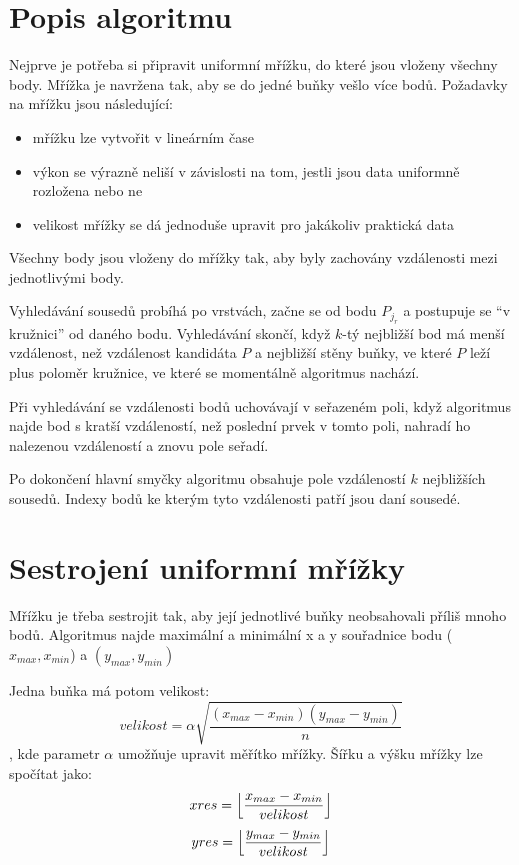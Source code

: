 \documentclass[
12pt,
a4paper,
pdftex,
czech,
titlepage
]{report}
\providecommand{\tightlist}{%
  \setlength{\itemsep}{0pt}\setlength{\parskip}{0pt}}
\begin{document}
\hypertarget{popis-algoritmu}{%
\chapter{Popis algoritmu}\label{popis-algoritmu}}

Nejprve je potřeba si připravit uniformní mřížku, do které jsou vloženy
všechny body. Mřížka je navržena tak, aby se do jedné buňky vešlo více
bodů. Požadavky na mřížku jsou následující:

\begin{itemize}
\tightlist
\item
  mřížku lze vytvořit v lineárním čase
\item
  výkon se výrazně neliší v závislosti na tom, jestli jsou data
  uniformně rozložena nebo ne
\item
  velikost mřížky se dá jednoduše upravit pro jakákoliv praktická data
\end{itemize}

Všechny body jsou vloženy do mřížky tak, aby byly zachovány vzdálenosti
mezi jednotlivými body.

Vyhledávání sousedů probíhá po vrstvách, začne se od bodu \(P_{j_{r}}\)
a postupuje se ``v kružnici'' od daného bodu. Vyhledávání skončí, když
\(k\)-tý nejbližší bod má menší vzdálenost, než vzdálenost kandidáta
\(P\) a nejbližší stěny buňky, ve které \(P\) leží plus poloměr
kružnice, ve které se momentálně algoritmus nachází.

Při vyhledávání se vzdálenosti bodů uchovávají v seřazeném poli, když algoritmus najde bod s kratší vzdáleností, než
poslední prvek v tomto poli, nahradí ho nalezenou vzdáleností a znovu pole seřadí.

Po dokončení hlavní smyčky algoritmu obsahuje pole vzdáleností \(k\)
nejbližších sousedů. Indexy bodů ke kterým tyto vzdálenosti patří jsou
daní sousedé.

\hypertarget{sestrojeni_mrizky}{%
\chapter{Sestrojení uniformní mřížky}\label{sestrojeni_mrizky}}

Mřížku je třeba sestrojit tak, aby její jednotlivé buňky neobsahovali
příliš mnoho bodů. Algoritmus najde maximální a minimální x a y souřadnice
bodu (\(x_{max}, x_{min}\)) a \((y_{max}, y_{min})\)

Jedna buňka má potom velikost:
\[velikost = \alpha \sqrt{\frac{(x_{max} - x_{min})(y_{max} - y_{min})}{n}}\], kde
parametr \(\alpha\) umožňuje upravit měřítko mřížky. Šířku a výšku
mřížky lze spočítat jako:
\[xres = \Bigl\lfloor{\frac{x_{max}-x_{min}}{velikost}}\Bigr\rfloor\]
\[yres = \Bigl\lfloor{\frac{y_{max}-y_{min}}{velikost}}\Bigr\rfloor\]
\end{document}
